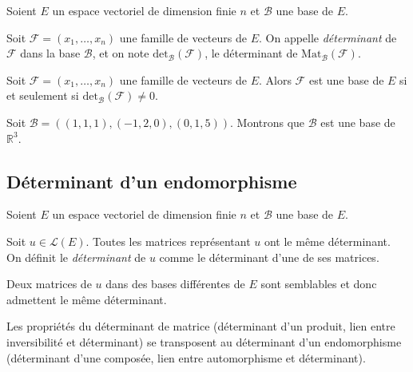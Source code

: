 \documentclass[french,11pt,twoside]{VcCours}
\begin{document}
Soient $E$ un espace vectoriel de dimension finie $n$ et $\mathcal{B}$ une base de $E$.

\begin{Definition}{} Soit $\mathcal{F} = (x_1, \ldots, x_n)$ une famille de vecteurs de $E$. On appelle \emph{déterminant} de $\mathcal{F}$ dans la base $\mathcal{B}$, et on note $\textrm{det}_{\mathcal{B}}(\mathcal{F})$, le déterminant de $\textrm{Mat}_{\mathcal{B}}(\mathcal{F})$.
\end{Definition}

\begin{Proposition}{} Soit $\mathcal{F} = (x_1, \ldots, x_n)$ une famille de vecteurs de $E$. Alors $\mathcal{F}$ est une base de $E$ si et seulement si \newline $\textrm{det}_{\mathcal{B}}(\mathcal{F}) \neq 0$.
\end{Proposition}

\begin{Exemple} Soit $\mathcal{B}=((1,1,1), (-1,2,0), (0,1,5))$. Montrons que $\mathcal{B}$ est une base de $\mathbb{R}^3$.

\vspace{5.5cm}
\end{Exemple}

\subsection{Déterminant d'un endomorphisme}

Soient $E$ un espace vectoriel de dimension finie $n$ et $\mathcal{B}$ une base de $E$.

\begin{TheoremeDefinition}{} Soit $u \in \mathcal{L}(E)$. Toutes les matrices représentant $u$ ont le même déterminant. On définit le \emph{déterminant} de $u$ comme le déterminant d'une de ses matrices.
\end{TheoremeDefinition}

\begin{Demonstration}{} Deux matrices de $u$ dans des bases différentes de $E$ sont semblables et donc admettent le même déterminant.
\end{Demonstration}

\medskip


\begin{Proposition}{} Les propriétés du déterminant de matrice (déterminant d'un produit, lien entre inversibilité et déterminant) se transposent au déterminant d'un endomorphisme (déterminant d'une composée, lien entre automorphisme et déterminant).
\end{Proposition} 
\end{document}

